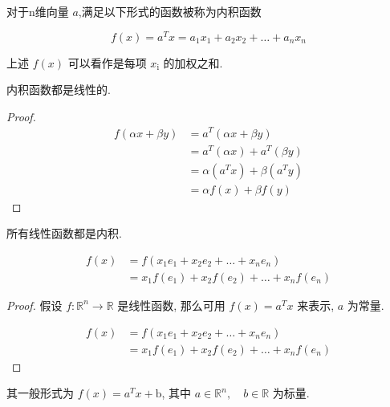 \begin{definition}
    对于n维向量 $ a $,满足以下形式的函数被称为内积函数

    $$ f(x)=a^{T} x=a_{1} x_{1}+a_{2} x_{2}+\ldots+a_{n} x_{n} $$
\end{definition}

上述 $ f(x) $ 可以看作是每项 $ x_{\mathrm{i}} $ 的加权之和. 

\begin{corollary}
    内积函数都是线性的.
\end{corollary}

\begin{proof}
    $$ \begin{aligned} f(\alpha x+\beta y) &=a^{T}(\alpha x+\beta y) \\ &=a^{T}(\alpha x)+a^{T}(\beta y) \\ &=\alpha\left(a^{T} x\right)+\beta\left(a^{T} y\right) \\ &=\alpha f(x)+\beta f(y) \end{aligned} $$
\end{proof}


\begin{corollary}
    所有线性函数都是内积.

    $$ \begin{aligned} f(x) &=f\left(x_{1} e_{1}+x_{2} e_{2}+\ldots+x_{n} e_{n}\right) \\ &=x_{1} f\left(e_{1}\right)+x_{2} f\left(e_{2}\right)+\ldots+x_{n} f\left(e_{n}\right) \end{aligned} $$
\end{corollary}

\begin{proof}
    假设 $ f: \mathbb{R}^{n} \rightarrow \mathbb{R} $ 是线性函数, 那么可用 $ f(x)=a^{T} x $ 来表示, $ a $ 为常量.

    $$ \begin{aligned} f(x) &=f\left(x_{1} e_{1}+x_{2} e_{2}+\ldots+x_{n} e_{n}\right) \\ &=x_{1} f\left(e_{1}\right)+x_{2} f\left(e_{2}\right)+\ldots+x_{n} f\left(e_{n}\right) \end{aligned} $$
\end{proof}





\begin{definition}
    其一般形式为 $ f(x)=a^{T} x+\mathrm{b} $, 其中 $ a \in \mathbb{R}^{n}, \quad b \in \mathbb{R} $ 为标量. 
\end{definition}

